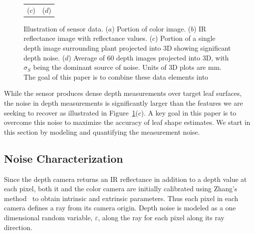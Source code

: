 \begin{figure}
\begin{center}
\begin{tabular}{ c c }
($c$) & ($d$) \\
\end{tabular}
\end{center}
\caption{Illustration of sensor data.  ($a$) Portion of color image. ($b$) IR reflectance image with reflectance values. ($c$) Portion of a single depth image surrounding plant projected into $3$D showing significant depth noise. ($d$) Average of 60 depth images projected into $3$D, with $\sigma_S$ being the dominant source of noise.  Units of $3$D plots are mm.  The goal of this paper is to combine these data elements into }
\label{fig:plantnoise}
\end{figure}

While the sensor produces dense depth measurements over target leaf surfaces, the noise in depth measurements is significantly larger than the features we are seeking to recover as illustrated in Figure~\ref{fig:plantnoise}($c$).  A key goal in this paper is to overcome this noise to maximize the accuracy of leaf shape estimates.  We start in this section by modeling and quantifying the measurement noise.



\subsection{Noise Characterization}
\label{sec:noise}

Since the depth camera returns an IR reflectance in addition to a depth value at each pixel, both it and the color camera are initially calibrated using Zhang's method~\cite{Zhang2000} to obtain intrinsic and extrinsic parameters.  Thus each pixel in each camera defines a ray from its camera origin.  Depth noise is modeled as a one dimensional random variable, $\varepsilon$, along the ray for each pixel along its ray direction.

